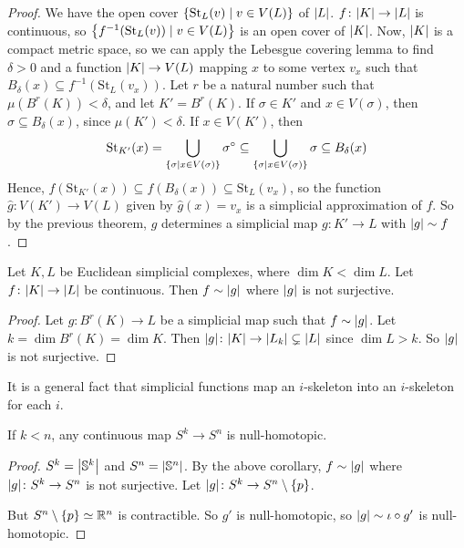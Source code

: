 \begin{proof}
	We have the open cover \( \qty{\mathrm{St}_L(v) \mid v \in V(L)} \) of \( \abs{L} \).
	\( f \colon \abs{K} \to \abs{L} \) is continuous, so \( \qty{f^{-1}(\mathrm{St}_L(v)) \mid v \in V(L)} \) is an open cover of \( \abs{K} \).
	Now, \( \abs{K} \) is a compact metric space, so we can apply the Lebesgue covering lemma to find \( \delta > 0 \) and a function \( \abs{K} \to V(L) \) mapping \( x \) to some vertex \( v_x \) such that \( B_\delta(x) \subseteq f^{-1}(\mathrm{St}_L(v_x)) \).
	Let \( r \) be a natural number such that \( \mu(B^r(K)) < \delta \), and let \( K' = B^r(K) \).
	If \( \sigma \in K' \) and \( x \in V(\sigma) \), then \( \sigma \subseteq B_\delta(x) \), since \( \mu(K') < \delta \).
	If \( x \in V(K') \), then
	\[ \mathrm{St}_{K'}(x) = \bigcup_{\qty{\sigma \mid x \in V(\sigma)}} \sigma^\circ \subseteq \bigcup_{\qty{\sigma \mid x \in V(\sigma)}} \sigma \subseteq B_\delta(x) \]
	Hence, \( f(\mathrm{St}_{K'}(x)) \subseteq f(B_\delta(x)) \subseteq \mathrm{St}_L(v_x) \), so the function \( \hat g \colon V(K') \to V(L) \) given by \( \hat g(x) = v_x \) is a simplicial approximation of \( f \).
	So by the previous theorem, \( \hat g \) determines a simplicial map \( g \colon K' \to L \) with \( \abs{g} \sim f \).
\end{proof}
\begin{corollary}
	Let \( K, L \) be Euclidean simplicial complexes, where \( \dim K < \dim L \).
	Let \( f \colon \abs{K} \to \abs{L} \) be continuous.
	Then \( f \sim \abs{g} \) where \( \abs{g} \) is not surjective.
\end{corollary}
\begin{proof}
	Let \( g \colon B^r(K) \to L \) be a simplicial map such that \( f \sim \abs{g} \).
	Let \( k = \dim B^r(K) = \dim K \).
	Then \( \abs{g} \colon \abs{K} \to \abs{L_k} \subsetneq \abs{L} \) since \( \dim L > k \).
	So \( \abs{g} \) is not surjective.
\end{proof}
\begin{remark}
	It is a general fact that simplicial functions map an \( i \)-skeleton into an \( i \)-skeleton for each \( i \).
\end{remark}
\begin{theorem}
	If \( k < n \), any continuous map \( S^k \to S^n \) is null-homotopic.
\end{theorem}
\begin{proof}
	\( S^k = \abs{\mathbb S^k} \) and \( S^n = \abs{\mathbb S^n} \).
	By the above corollary, \( f \sim \abs{g} \) where \( \abs{g} \colon S^k \to S^n \) is not surjective.
	Let \( \abs{g} \colon S^k \to S^n \setminus \qty{p} \).
	\begin{center}
	\end{center}
	But \( S^n \setminus \qty{p} \simeq \mathbb R^n \) is contractible.
	So \( g' \) is null-homotopic, so \( \abs{g} \sim \iota \circ g' \) is null-homotopic.
\end{proof}
